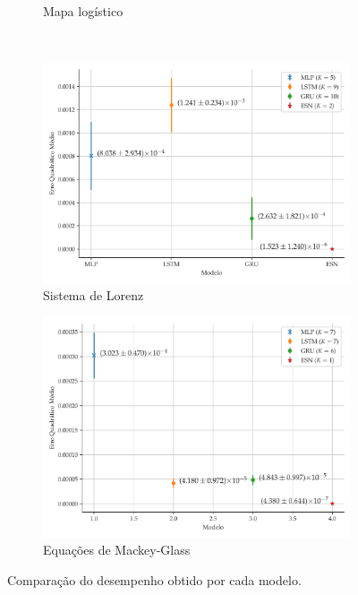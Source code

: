 \documentclass[aspectratio=169]{beamer}
\begin{document}
\begin{frame}
\begin{figure}[!h]
\begin{subfigure}[t]{0.4\textwidth}
         \caption{Mapa logístico}
     \end{subfigure}
     \centering\\
     \begin{subfigure}[t]{0.4\textwidth}
     \centering
         \includegraphics[scale=0.15]{comparacao-k-lorenz.pdf}
         \caption{Sistema de Lorenz}
     \end{subfigure}
     \centering
     \begin{subfigure}[t]{0.4\textwidth} 
     \centering
         \includegraphics[scale=0.15]{comparacao-k-mackeyglass.pdf}
         \caption{Equações de Mackey-Glass}
     \end{subfigure}  
     \centering   
     \caption{Comparação do desempenho obtido por cada modelo.}
     \label{fig:model-comparison}
\end{figure}
\end{frame}
\end{document}
